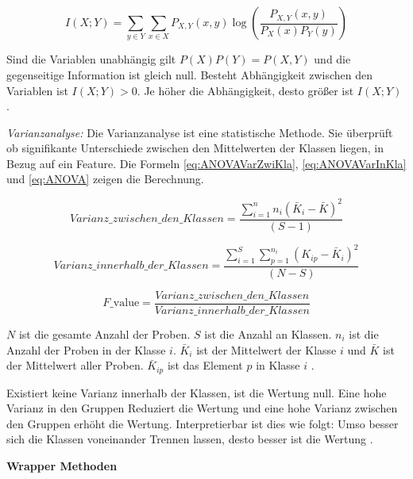 \begin{equation}
I(X; Y) = \sum_{y \in Y} \sum_{x \in X} P_{X,Y}(x, y) \log \left( \frac{P_{X,Y}(x, y)}{P_X(x) P_Y(y)} \right)
\label{eq:MutInfo}
\end{equation}

Sind die Variablen unabhängig gilt \(P(X)P(Y) = P(X,Y)\) und die gegenseitige Information ist gleich null. Besteht Abhängigkeit zwischen den Variablen ist \(I(X; Y) > 0\). Je höher die Abhängigkeit, desto größer ist \(I(X; Y)\) \cite{Cover.2006}.\par

\textit{Varianzanalyse:} Die Varianzanalyse ist eine statistische Methode. Sie überprüft ob signifikante Unterschiede zwischen den Mittelwerten der Klassen liegen, in Bezug auf ein \gls{Feature}. Die Formeln \ref{eq:ANOVAVarZwiKla}, \ref{eq:ANOVAVarInKla} und  \ref{eq:ANOVA} zeigen die Berechnung.

\begin{equation}
Varianz\_zwischen\_den\_Klassen = \frac{\sum_{i=1}^{n} n_i(\bar{K}_i - \bar{K})^2}{(S - 1)}
\label{eq:ANOVAVarZwiKla}
\end{equation}

\begin{equation}
Varianz\_innerhalb\_der\_Klassen = \frac{\sum_{i=1}^{S} \sum_{p=1}^{n_i} (K_{ip} - \bar{K}_i)^2}{(N - S)}
\label{eq:ANOVAVarInKla}
\end{equation}

\begin{equation}
F\text{\_value} = \frac{Varianz\_zwischen\_den\_Klassen}{Varianz\_innerhalb\_der\_Klassen}
\label{eq:ANOVA}
\end{equation}

\(N\) ist die gesamte Anzahl der Proben. \(S\) ist die Anzahl an Klassen. \(n_i\) ist die Anzahl der Proben in der Klasse \(i\). \(\bar{K}_i\) ist der Mittelwert der Klasse \(i\) und \(\bar{K}\) ist der Mittelwert aller Proben. \(\bar{K}_{ip}\) ist das Element \(p\) in Klasse \(i\) \cite{Pathan.2022}. \par

Existiert keine Varianz innerhalb der Klassen, ist die Wertung null. Eine hohe Varianz in den Gruppen Reduziert die Wertung und eine hohe Varianz zwischen den Gruppen erhöht die Wertung. Interpretierbar ist dies wie folgt: Umso besser sich die Klassen voneinander Trennen lassen, desto besser ist die Wertung \cite{Pathan.2022, Guyon.2003}. \dubpar

\textbf{\gls{Wrapper Methoden}}\par

